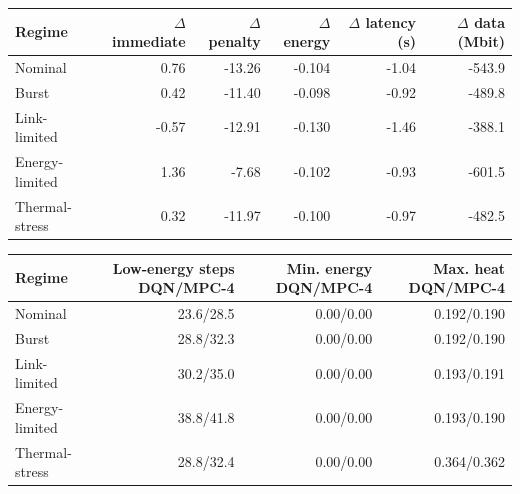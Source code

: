 \begin{tabular}{lrrrrr}
\toprule
Regime & $\Delta$ immediate & $\Delta$ penalty & $\Delta$ energy & $\Delta$ latency (s) & $\Delta$ data (Mbit) \\
\midrule
Nominal & 0.76 & -13.26 & -0.104 & -1.04 & -543.9 \\
Burst & 0.42 & -11.40 & -0.098 & -0.92 & -489.8 \\
Link-limited & -0.57 & -12.91 & -0.130 & -1.46 & -388.1 \\
Energy-limited & 1.36 & -7.68 & -0.102 & -0.93 & -601.5 \\
Thermal-stress & 0.32 & -11.97 & -0.100 & -0.97 & -482.5 \\
\bottomrule
\end{tabular}
\par\medskip
\begin{tabular}{lrrr}
\toprule
Regime & Low-energy steps DQN/MPC-4 & Min. energy DQN/MPC-4 & Max. heat DQN/MPC-4 \\
\midrule
Nominal & 23.6/28.5 & 0.00/0.00 & 0.192/0.190 \\
Burst & 28.8/32.3 & 0.00/0.00 & 0.192/0.190 \\
Link-limited & 30.2/35.0 & 0.00/0.00 & 0.193/0.191 \\
Energy-limited & 38.8/41.8 & 0.00/0.00 & 0.193/0.190 \\
Thermal-stress & 28.8/32.4 & 0.00/0.00 & 0.364/0.362 \\
\bottomrule
\end{tabular}